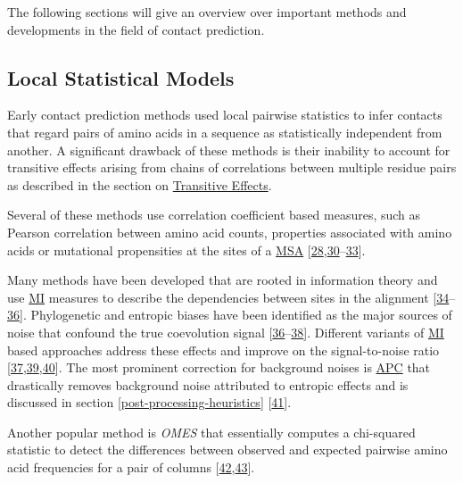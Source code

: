 \documentclass[12pt,a4paper,twoside]{book}
\theoremstyle{definition}
\theoremstyle{definition}
\theoremstyle{remark}
\begin{document}
The following sections will give an overview over important methods and
developments in the field of contact prediction.

\subsection{Local Statistical Models}\label{local-methods}

Early contact prediction methods used local pairwise statistics to infer
contacts that regard pairs of amino acids in a sequence as statistically
independent from another. A significant drawback of these methods is
their inability to account for transitive effects arising from chains of
correlations between multiple residue pairs as described in the section
on \protect\hyperlink{transitive-effects}{Transitive Effects}.

Several of these methods use correlation coefficient based measures,
such as Pearson correlation between amino acid counts, properties
associated with amino acids or mutational propensities at the sites of a
\protect\hyperlink{abbrev}{MSA}
{[}\protect\hyperlink{ref-Gobel1994}{28},\protect\hyperlink{ref-Neher1994}{30}--\protect\hyperlink{ref-Shindyalov1994}{33}{]}.

Many methods have been developed that are rooted in information theory
and use \protect\hyperlink{abbrev}{MI} measures to describe the
dependencies between sites in the alignment
{[}\protect\hyperlink{ref-Clarke1995}{34}--\protect\hyperlink{ref-Martin2005}{36}{]}.
Phylogenetic and entropic biases have been identified as the major
sources of noise that confound the true coevolution signal
{[}\protect\hyperlink{ref-Martin2005}{36}--\protect\hyperlink{ref-Fodor2004}{38}{]}.
Different variants of \protect\hyperlink{abbrev}{MI} based approaches
address these effects and improve on the signal-to-noise ratio
{[}\protect\hyperlink{ref-Atchley2000}{37},\protect\hyperlink{ref-Tillier2003}{39},\protect\hyperlink{ref-Gouveia_Oliveira2007}{40}{]}.
The most prominent correction for background noises is
\protect\hyperlink{abbrev}{APC} that drastically removes background
noise attributed to entropic effects and is discussed in section
\ref{post-processing-heuristics}
{[}\protect\hyperlink{ref-Dunn2008}{41}{]}.

Another popular method is \emph{OMES} that essentially computes a
chi-squared statistic to detect the differences between observed and
expected pairwise amino acid frequencies for a pair of columns
{[}\protect\hyperlink{ref-Kass2002}{42},\protect\hyperlink{ref-Noivirt2005}{43}{]}.
\end{document}

